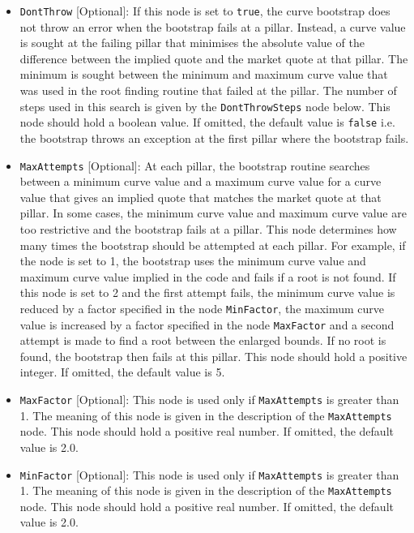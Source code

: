 \documentclass[12pt, a4paper]{article}
\begin{document}
{{\begin{itemize}
\item \lstinline!DontThrow! [Optional]:
If this node is set to \lstinline!true!, the curve bootstrap does not throw an error when the bootstrap fails at a pillar. Instead, a curve value is sought at the failing pillar that minimises the absolute value of the difference between the implied quote and the market quote at that pillar. The minimum is sought between the minimum and maximum curve value that was used in the root finding routine that failed at the pillar. The number of steps used in this search is given by the \lstinline!DontThrowSteps! node below. This node should hold a boolean value. If omitted, the default value is \lstinline!false! i.e. the bootstrap throws an exception at the first pillar where the bootstrap fails.

\item \lstinline!MaxAttempts! [Optional]:
At each pillar, the bootstrap routine searches between a minimum curve value and a maximum curve value for a curve value that gives an implied quote that matches the market quote at that pillar. In some cases, the minimum curve value and maximum curve value are too restrictive and the bootstrap fails at a pillar. This node determines how many times the bootstrap should be attempted at each pillar. For example, if the node is set to 1, the bootstrap uses the minimum curve value and maximum curve value implied in the code and fails if a root is not found. If this node is set to 2 and the first attempt fails, the minimum curve value is reduced by a factor specified in the node \lstinline!MinFactor!, the maximum curve value is increased by a factor specified in the node \lstinline!MaxFactor! and a second attempt is made to find a root between the enlarged bounds. If no root is found, the bootstrap then fails at this pillar. This node should hold a positive integer. If omitted, the default value is 5.

\item \lstinline!MaxFactor! [Optional]:
This node is used only if \lstinline!MaxAttempts! is greater than 1. The meaning of this node is given in the description of the \lstinline!MaxAttempts! node. This node should hold a positive real number. If omitted, the default value is 2.0.

\item \lstinline!MinFactor! [Optional]:
This node is used only if \lstinline!MaxAttempts! is greater than 1. The meaning of this node is given in the description of the \lstinline!MaxAttempts! node. This node should hold a positive real number. If omitted, the default value is 2.0.


\end{itemize}}}
\end{document}
